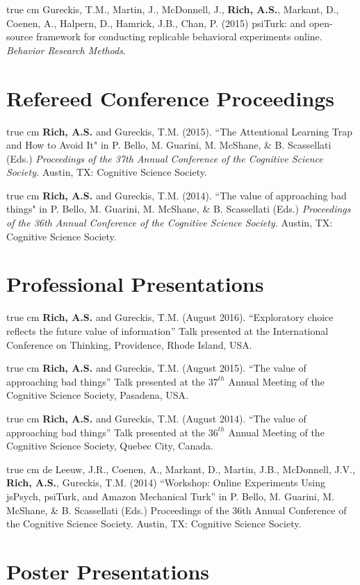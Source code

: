 \documentclass[12pt]{my_cv}
\def\ind{\hangindent=1 true cm\hangafter=1 \noindent}
\begin{document}
\ind Gureckis, T.M., Martin, J., McDonnell, J., \textbf{Rich, A.S.}, Markant,
D., Coenen, A., Halpern, D., Hamrick, J.B., Chan, P. (2015) psiTurk: and
open-source framework for conducting replicable behavioral experiments online.
\emph{Behavior Research Methods}.

\section{Refereed Conference Proceedings}

\ind \textbf{Rich, A.S.} and Gureckis, T.M. (2015). ``The Attentional Learning Trap and How to Avoid It" in P. Bello, M. Guarini, M. McShane, \& B. Scassellati (Eds.) \emph{Proceedings of the 37th Annual Conference of the Cognitive Science Society.} Austin, TX: Cognitive Science Society.	

\ind \textbf{Rich, A.S.} and Gureckis, T.M. (2014). ``The value of approaching bad things" in P. Bello, M. Guarini, M. McShane, \& B. Scassellati (Eds.) \emph{Proceedings of the 36th Annual Conference of the Cognitive Science Society.} Austin, TX: Cognitive Science Society.	

\section{Professional Presentations}

\ind \textbf{Rich, A.S.} and Gureckis, T.M. (August 2016). ``Exploratory choice
reflects the future value of information'' Talk presented at the International
Conference on Thinking, Providence, Rhode Island, USA.

\ind \textbf{Rich, A.S.} and Gureckis, T.M. (August 2015). ``The value of
approaching bad things'' Talk presented at the $37^{th}$ Annual Meeting of the
Cognitive Science Society, Pasadena, USA.

\ind \textbf{Rich, A.S.} and Gureckis, T.M. (August 2014). ``The value of
approaching bad things'' Talk presented at the $36^{th}$ Annual Meeting of the
Cognitive Science Society, Quebec City, Canada.

\ind de Leeuw, J.R., Coenen, A., Markant, D., Martin, J.B., McDonnell, J.V.,
\textbf{Rich, A.S.}, Gureckis, T.M. (2014) ``Workshop: Online Experiments Using
jsPsych, psiTurk, and Amazon Mechanical Turk'' in P. Bello, M. Guarini, M.
McShane, \& B. Scassellati (Eds.) Proceedings of the 36th Annual Conference of
the Cognitive Science Society. Austin, TX: Cognitive Science Society.

\section{Poster Presentations}
\end{document}
